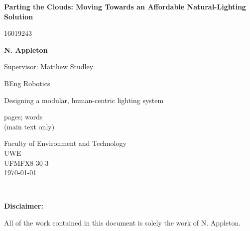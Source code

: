 \documentclass[twoside,twocolumn]{report}
\begin{document}

\begin{titlepage}

    \begin{center}
        \vspace*{1cm}
            
        \Huge
        \textbf{Parting the Clouds: Moving Towards an Affordable Natural-Lighting Solution}
            
        \vspace{0.5cm}
        \LARGE
        16019243
            
        \vspace{1.5cm}
            
        \textbf{N. Appleton}
        
        \vspace{0.5cm}
        Supervisor: Matthew Studley
        
        BEng Robotics
            
        \vfill
            
        Designing a modular, human-centric lighting system   
        
        \pageref{Lastpage} pages; 
        words \\ (main text only)
            
        \vspace{0.8cm}
            
        \Large
        Faculty of Environment and Technology\\
        UWE\\
        UFMFX8-30-3 \\
        \today
            
    \end{center}
\end{titlepage}


\begin{titlepage}
\centering
~
\vfill

\textbf{Disclaimer:}

All of the work contained in this document is solely the work of N. Appleton.

\vfill
~ \vfill
\end{titlepage}

\setcounter{tocdepth}{1}
\tableofcontents 
\clearpage \newpage














\label{Lastpage}


\end{document}

